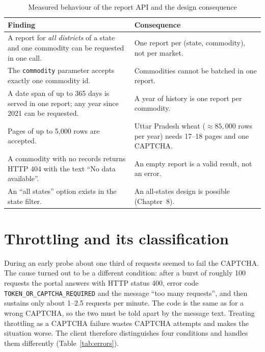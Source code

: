 \documentclass[12pt,a4paper,oneside]{report}
\numberwithin{equation}{chapter}
\numberwithin{figure}{chapter}
\numberwithin{table}{chapter}
\theoremstyle{definition}
\begin{document}
\begin{table}[H]
\centering
\caption{Measured behaviour of the report API and the design consequence}
\label{tab:apifacts}
\small
\begin{tabular}{@{}p{}p{}@{}}
\toprule
Finding & Consequence \\
\midrule
A report for \emph{all districts} of a state and one commodity can be requested in one call. & One report per (state, commodity), not per market. \\
The \texttt{commodity} parameter accepts exactly one commodity id. & Commodities cannot be batched in one report. \\
A date span of up to 365 days is served in one report; any year since 2021 can be requested. & A year of history is one report per commodity. \\
Pages of up to 5,000 rows are accepted. & Uttar Pradesh wheat ($\approx 85{,}000$ rows per year) needs 17--18 pages and one CAPTCHA. \\
A commodity with no records returns HTTP 404 with the text ``No data available''. & An empty report is a valid result, not an error. \\
An ``all states'' option exists in the state filter. & An all-states design is possible (Chapter~8). \\
\bottomrule
\end{tabular}
\end{table}

\section{Throttling and its classification}\label{sec:throttle}
During an early probe about one third of requests seemed to fail the CAPTCHA. The cause turned out to be a different condition: after a burst of roughly 100 requests the portal answers with HTTP status 400, error code \texttt{TOKEN\_OR\_CAPTCHA\_REQUIRED} and the message ``too many requests'', and then sustains only about 1--2.5 requests per minute. The code is the same as for a wrong CAPTCHA, so the two must be told apart by the message text. Treating throttling as a CAPTCHA failure wastes CAPTCHA attempts and makes the situation worse. The client therefore distinguishes four conditions and handles them differently (Table~\ref{tab:errors}).
\end{document}
